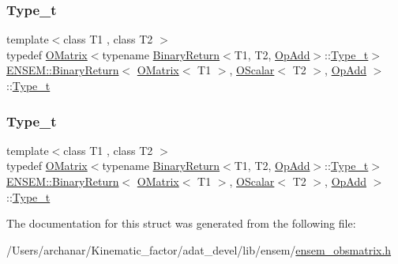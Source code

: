 \subsubsection{\texorpdfstring{Type\_t}{Type\_t}\hspace{0.1cm}{\footnotesize\ttfamily [1/2]}}
{\footnotesize\ttfamily template$<$class T1 , class T2 $>$ \\
typedef \mbox{\hyperlink{classENSEM_1_1OMatrix}{O\+Matrix}}$<$typename \mbox{\hyperlink{structENSEM_1_1BinaryReturn}{Binary\+Return}}$<$T1, T2, \mbox{\hyperlink{structENSEM_1_1OpAdd}{Op\+Add}}$>$\+::\mbox{\hyperlink{structENSEM_1_1BinaryReturn_3_01OMatrix_3_01T1_01_4_00_01OScalar_3_01T2_01_4_00_01OpAdd_01_4_a01b3c8b1961280e45c4548f85bd70c7c}{Type\+\_\+t}}$>$ \mbox{\hyperlink{structENSEM_1_1BinaryReturn}{E\+N\+S\+E\+M\+::\+Binary\+Return}}$<$ \mbox{\hyperlink{classENSEM_1_1OMatrix}{O\+Matrix}}$<$ T1 $>$, \mbox{\hyperlink{classENSEM_1_1OScalar}{O\+Scalar}}$<$ T2 $>$, \mbox{\hyperlink{structENSEM_1_1OpAdd}{Op\+Add}} $>$\+::\mbox{\hyperlink{structENSEM_1_1BinaryReturn_3_01OMatrix_3_01T1_01_4_00_01OScalar_3_01T2_01_4_00_01OpAdd_01_4_a01b3c8b1961280e45c4548f85bd70c7c}{Type\+\_\+t}}}

\mbox{\label{structENSEM_1_1BinaryReturn_3_01OMatrix_3_01T1_01_4_00_01OScalar_3_01T2_01_4_00_01OpAdd_01_4_a01b3c8b1961280e45c4548f85bd70c7c}} 
\subsubsection{\texorpdfstring{Type\_t}{Type\_t}\hspace{0.1cm}{\footnotesize\ttfamily [2/2]}}
{\footnotesize\ttfamily template$<$class T1 , class T2 $>$ \\
typedef \mbox{\hyperlink{classENSEM_1_1OMatrix}{O\+Matrix}}$<$typename \mbox{\hyperlink{structENSEM_1_1BinaryReturn}{Binary\+Return}}$<$T1, T2, \mbox{\hyperlink{structENSEM_1_1OpAdd}{Op\+Add}}$>$\+::\mbox{\hyperlink{structENSEM_1_1BinaryReturn_3_01OMatrix_3_01T1_01_4_00_01OScalar_3_01T2_01_4_00_01OpAdd_01_4_a01b3c8b1961280e45c4548f85bd70c7c}{Type\+\_\+t}}$>$ \mbox{\hyperlink{structENSEM_1_1BinaryReturn}{E\+N\+S\+E\+M\+::\+Binary\+Return}}$<$ \mbox{\hyperlink{classENSEM_1_1OMatrix}{O\+Matrix}}$<$ T1 $>$, \mbox{\hyperlink{classENSEM_1_1OScalar}{O\+Scalar}}$<$ T2 $>$, \mbox{\hyperlink{structENSEM_1_1OpAdd}{Op\+Add}} $>$\+::\mbox{\hyperlink{structENSEM_1_1BinaryReturn_3_01OMatrix_3_01T1_01_4_00_01OScalar_3_01T2_01_4_00_01OpAdd_01_4_a01b3c8b1961280e45c4548f85bd70c7c}{Type\+\_\+t}}}



The documentation for this struct was generated from the following file\+:\begin{DoxyCompactItemize}
\item 
/\+Users/archanar/\+Kinematic\+\_\+factor/adat\+\_\+devel/lib/ensem/\mbox{\hyperlink{lib_2ensem_2ensem__obsmatrix_8h}{ensem\+\_\+obsmatrix.\+h}}\end{DoxyCompactItemize}
